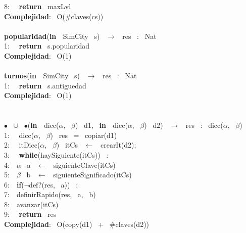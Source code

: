 \begin{Algoritmos}
    8: \  \ \textbf{return} \ maxLvl\\
    \textbf{Complejidad}: \ O($ \# $claves(cs))\\
    \makebox[\linewidth]{\rule{\textwidth}{0.4pt}}
    \\
    \makebox[\linewidth]{\rule{\textwidth}{0.4pt}}
    \textbf{popularidad}(\textbf{in \ }SimCity \ s) \ $\rightarrow $ \ res \ : \ Nat\\
    1: \  \ \textbf{return} \ s.popularidad\\
    \textbf{Complejidad}: \ O(1)\\
    \makebox[\linewidth]{\rule{\textwidth}{0.4pt}}
    \\
    \makebox[\linewidth]{\rule{\textwidth}{0.4pt}}
    \textbf{turnos}(\textbf{in \ }SimCity \ s) \ $\rightarrow $ \ res \ : \ Nat\\
    1: \  \ \textbf{return} \ s.antiguedad\\
    \textbf{Complejidad}: \ O(1)\\
    \makebox[\linewidth]{\rule{\textwidth}{0.4pt}}
    \\
    \pagebreak \\
    \makebox[\linewidth]{\rule{\textwidth}{0.4pt}}
    $\bullet$ \ $\cup$ \ $\bullet$(\textbf{in \ }dicc($\alpha$, \ $\beta$) \ d1, \ \textbf{in \ }dicc($\alpha$, \ $\beta$) \ d2) \ $\rightarrow $ \ res \ : \ dicc($\alpha$, \ $\beta$)\\
    1: \  \ dicc($\alpha$, \ $\beta$) \ res \ = \ copiar(d1)\\
    2: \  \ itDicc($\alpha$, \ $\beta$) \ itCs \ $\leftarrow$ \ crearIt(d2);\\
    3: \  \ \textbf{while}(haySiguiente(itCs)) \ :\\
    4:\indent  \  \ $\alpha$ \ a \ $\leftarrow$ \ siguienteClave(itCs)\\
    5:\indent  \  \ $\beta$ \ b \ $\leftarrow$ \ siguienteSignificado(itCs)\\
    6:\indent  \  \ \textbf{if}($\neg$def?(res, \ a)) \ :\\
    7:\indent \indent  \  \ definirRapido(res, \ a, \ b)\\
    8:\indent  \  \ avanzar(itCs)\\
    9: \  \ \textbf{return} \ res\\
    \textbf{Complejidad}: \ O(copy(d1) \ + \ $ \# $claves(d2))\\
    \makebox[\linewidth]{\rule{\textwidth}{0.4pt}}
    
\end{Algoritmos}

